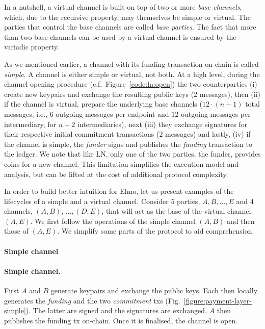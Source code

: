   In a nutshell, a virtual channel is built on top of two or more \emph{base
  channels}, which, due to the recursive property, may themselves be simple or
  virtual. The parties that control the base channels are called \emph{base
  parties}. The fact that more than two base channels can be used by a
  virtual channel is ensured by the variadic property.

  As we mentioned earlier, a channel with its funding transaction on-chain is
  called \emph{simple}. A channel is either simple or virtual, not both. At a
  high level, during the channel opening procedure (c.f.\
  Figure~\ref{code:ln:open}) the two counterparties (i) create new keypairs and
  exchange the resulting public keys ($2$ messages), then (ii) if the channel is
  virtual, prepare the underlying base channels ($12 \cdot (n-1)$ total
  messages, i.e., $6$ outgoing messages per endpoint and $12$ outgoing messages
  per intermediary, for $n-2$ intermediaries), next (iii) they exchange
  signatures for their respective initial commitment transactions ($2$ messages)
  and lastly, (iv) if the channel is simple, the \emph{funder} signs and
  publishes the \emph{funding} transaction to the ledger. We note that like LN,
  only one of the two parties, the funder, provides coins for a new channel.
  This limitation simplifies the execution model and analysis, but can be lifted
  at the cost of additional protocol complexity.

  In order to build better intuition for Elmo, let us present examples of the
  lifecycles of a simple and a virtual channel. Consider $5$ parties, $A, B,
  \dots, E$ and $4$ channels, $(A, B)$, $\dots,(D, E)$, that will act as
  the base of the virtual channel $(A, E)$. We first follow the operations of
  the simple channel $(A, B)$ and then those of $(A, E)$. We simplify some parts
  of the protocol to aid comprehension.

  \makeatletter%
    {\paragraph{Simple channel}}%
    {\paragraph{Simple channel.}}%
  \makeatother%
  First $A$ and $B$ generate keypairs and exchange the public keys. Each then
  locally generates the \emph{funding} and the two \emph{commitment} txs
  (Fig.~\ref{figure:payment-layer-simple}). The latter are signed and the
  signatures are exchanged. $A$ then publishes the funding tx on-chain. Once it
  is finalised, the channel is open.


